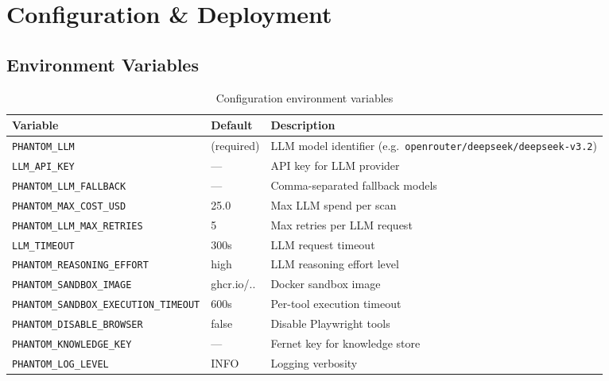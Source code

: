 \documentclass[11pt,a4paper]{article}
\begin{document}
\section{Configuration \& Deployment}
\label{sec:config}

\subsection{Environment Variables}
{\footnotesize
\begin{longtable}{p{4.5cm}p{1.5cm}p{6.5cm}}
\caption{Configuration environment variables} \label{tab:config} \\
\toprule
\textbf{Variable} & \textbf{Default} & \textbf{Description} \\
\midrule
\endfirsthead
\endhead
\bottomrule
\endfoot
\texttt{PHANTOM\_LLM}                    & (required)  & LLM model identifier (e.g.\ \texttt{openrouter/deepseek/deepseek-v3.2}) \\
\texttt{LLM\_API\_KEY}                   & ---         & API key for LLM provider \\
\texttt{PHANTOM\_LLM\_FALLBACK}          & ---         & Comma-separated fallback models \\
\texttt{PHANTOM\_MAX\_COST\_USD}          & 25.0        & Max LLM spend per scan \\
\texttt{PHANTOM\_LLM\_MAX\_RETRIES}       & 5           & Max retries per LLM request \\
\texttt{LLM\_TIMEOUT}                     & 300s        & LLM request timeout \\
\texttt{PHANTOM\_REASONING\_EFFORT}       & high        & LLM reasoning effort level \\
\texttt{PHANTOM\_SANDBOX\_IMAGE}          & ghcr.io/..  & Docker sandbox image \\
\texttt{PHANTOM\_SANDBOX\_EXECUTION\_TIMEOUT} & 600s   & Per-tool execution timeout \\
\texttt{PHANTOM\_DISABLE\_BROWSER}        & false       & Disable Playwright tools \\
\texttt{PHANTOM\_KNOWLEDGE\_KEY}          & ---         & Fernet key for knowledge store \\
\texttt{PHANTOM\_LOG\_LEVEL}              & INFO        & Logging verbosity \\
\end{longtable}
}
\end{document}
